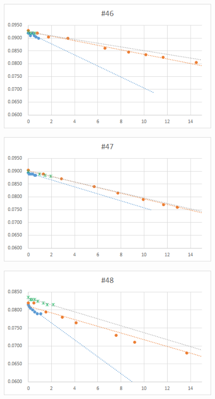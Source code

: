   \begin{figure}[htbp]
    \centering
       \includegraphics[width=120mm]{vol_046.png}
  \end{figure}
  \begin{figure}[htbp]
    \centering
       \includegraphics[width=120mm]{vol_047.png}
  \end{figure}
  \clearpage
  \begin{figure}[htbp]
    \centering
       \includegraphics[width=120mm]{vol_048.png}
  \end{figure}
